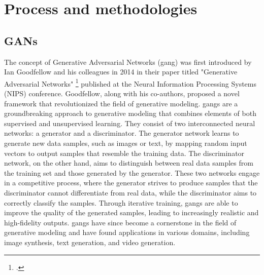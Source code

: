 \chapter{Process and methodologies}
\label{cap:process-methodologies}

\section{GANs}
\label{sec:gans}
The concept of Generative Adversarial Networks (\gls{gang}) was first introduced by Ian Goodfellow and his colleagues in 2014 in their paper titled "Generative Adversarial Networks" \footcite{paper:ganpaper} published at the Neural Information Processing Systems (NIPS) conference. 
Goodfellow, along with his co-authors, proposed a novel framework that revolutionized the field of generative modeling. 
\gls{gang}s are a groundbreaking approach to generative modeling that combines elements of both supervised and unsupervised learning. 
They consist of two interconnected neural networks: a generator and a discriminator. 
The generator network learns to generate new data samples, such as images or text, by mapping random input vectors to output samples that resemble the training data. 
The discriminator network, on the other hand, aims to distinguish between real data samples from the training set and those generated by the generator. 
These two networks engage in a competitive process, where the generator strives to produce samples that the discriminator cannot differentiate from real data, while the discriminator aims to correctly classify the samples. 
Through iterative training, \gls{gang}s are able to improve the quality of the generated samples, leading to increasingly realistic and high-fidelity outputs. 
\gls{gang}s have since become a cornerstone in the field of generative modeling and have found applications in various domains, including image synthesis, text generation, and video generation. 

